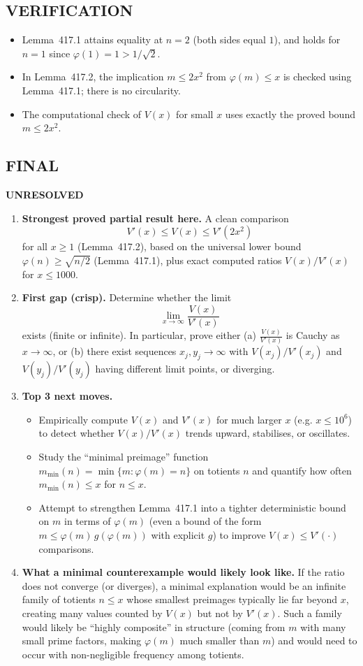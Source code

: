 \subsection*{VERIFICATION}
\begin{itemize}
\item Lemma~417.1 attains equality at $n=2$ (both sides equal $1$), and holds for $n=1$ since $\varphi(1)=1>1/\sqrt{2}$.
\item In Lemma~417.2, the implication $m\le 2x^2$ from $\varphi(m)\le x$ is checked using Lemma~417.1; there is no circularity.
\item The computational check of $V(x)$ for small $x$ uses exactly the proved bound $m\le 2x^2$.
\end{itemize}

\subsection*{FINAL}
\textbf{UNRESOLVED}
\begin{enumerate}
\item[(i)] \textbf{Strongest proved partial result here.}
A clean comparison
\[
V'(x)\le V(x)\le V'(2x^2)
\]
for all $x\ge 1$ (Lemma~417.2), based on the universal lower bound $\varphi(n)\ge\sqrt{n/2}$ (Lemma~417.1), plus exact computed ratios $V(x)/V'(x)$ for $x\le 1000$.
\item[(ii)] \textbf{First gap (crisp).}
Determine whether the limit
\[
\lim_{x\to\infty}\frac{V(x)}{V'(x)}
\]
exists (finite or infinite). In particular, prove either (a) $\frac{V(x)}{V'(x)}$ is Cauchy as $x\to\infty$, or (b) there exist sequences $x_j,y_j\to\infty$ with $V(x_j)/V'(x_j)$ and $V(y_j)/V'(y_j)$ having different limit points, or diverging.
\item[(iii)] \textbf{Top 3 next moves.}
\begin{itemize}
\item Empirically compute $V(x)$ and $V'(x)$ for much larger $x$ (e.g. $x\le 10^6$) to detect whether $V(x)/V'(x)$ trends upward, stabilises, or oscillates.
\item Study the ``minimal preimage'' function $m_{\min}(n)=\min\{m: \varphi(m)=n\}$ on totients $n$ and quantify how often $m_{\min}(n)\le x$ for $n\le x$.
\item Attempt to strengthen Lemma~417.1 into a tighter deterministic bound on $m$ in terms of $\varphi(m)$ (even a bound of the form $m\le \varphi(m)\,g(\varphi(m))$ with explicit $g$) to improve $V(x)\le V'(\cdot)$ comparisons.
\end{itemize}
\item[(iv)] \textbf{What a minimal counterexample would likely look like.}
If the ratio does not converge (or diverges), a minimal explanation would be an infinite family of totients $n\le x$ whose smallest preimages typically lie far beyond $x$, creating many values counted by $V(x)$ but not by $V'(x)$. Such a family would likely be ``highly composite'' in structure (coming from $m$ with many small prime factors, making $\varphi(m)$ much smaller than $m$) and would need to occur with non-negligible frequency among totients.
\end{enumerate}


